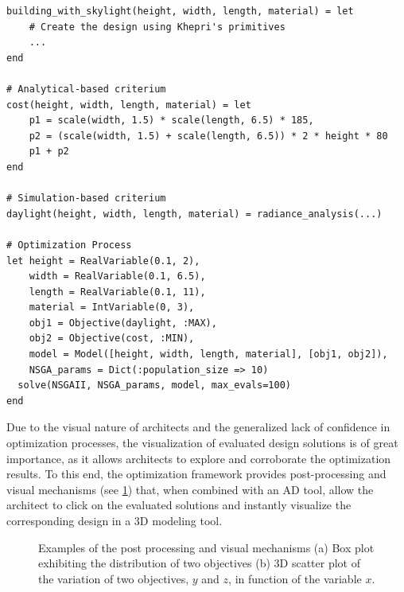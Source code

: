 \begin{lstlisting}[caption={BPO example of the framework's API using the Khepri AD tool.},label=BPOjuliaCode]	
building_with_skylight(height, width, length, material) = let
	# Create the design using Khepri's primitives
	...
end

# Analytical-based criterium
cost(height, width, length, material) = let
	p1 = scale(width, 1.5) * scale(length, 6.5) * 185,
	p2 = (scale(width, 1.5) + scale(length, 6.5)) * 2 * height * 80
	p1 + p2
end

# Simulation-based criterium
daylight(height, width, length, material) = radiance_analysis(...)

# Optimization Process
let height = RealVariable(0.1, 2),
	width = RealVariable(0.1, 6.5),
	length = RealVariable(0.1, 11),
	material = IntVariable(0, 3),
	obj1 = Objective(daylight, :MAX),
	obj2 = Objective(cost, :MIN),
	model = Model([height, width, length, material], [obj1, obj2]),
	NSGA_params = Dict(:population_size => 10)
  solve(NSGAII, NSGA_params, model, max_evals=100)
end
\end{lstlisting}

Due to the visual nature of architects and the generalized lack of confidence in optimization processes, the visualization of evaluated design solutions is of great importance, as it allows architects to explore and corroborate the optimization results. To this end, the optimization framework provides post-processing and visual mechanisms (see \cref{fig:postprocessing}) that, when combined with an \ac{AD} tool, allow the architect to click on the evaluated solutions and instantly visualize the corresponding design in a 3D modeling tool. 

\begin{figure}[htbp]
	\centering
	\hfill
	
	\caption[Examples of the post processing and visual mechanisms of the proposed solution]{Examples of the post processing and visual mechanisms (a) Box plot exhibiting the distribution of two objectives (b) 3D scatter plot of the variation of two objectives, $y$ and $z$, in function of the variable $x$.}
	\label{fig:postprocessing}
\end{figure}


